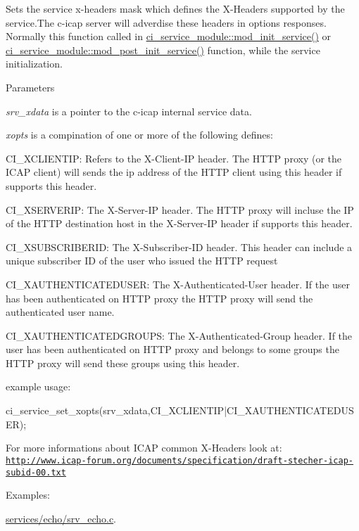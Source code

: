 Sets the service x-\/headers mask which defines the X-\/Headers supported by the service.The c-\/icap server will adverdise these headers in options responses. Normally this function called in \hyperlink{structci__service__module_acf9f56283f9418715be2f87967928876}{ci\_\-service\_\-module::mod\_\-init\_\-service()} or \hyperlink{structci__service__module_a3975fa968c80e30d77f3f1bac100e9e1}{ci\_\-service\_\-module::mod\_\-post\_\-init\_\-service()} function, while the service initialization. 
\begin{DoxyParams}{Parameters}
\item[{\em srv\_\-xdata}]is a pointer to the c-\/icap internal service data. \item[{\em xopts}]is a compination of one or more of the following defines:
\begin{DoxyItemize}
\item CI\_\-XCLIENTIP: Refers to the X-\/Client-\/IP header. The HTTP proxy (or the ICAP client) will sends the ip address of the HTTP client using this header if supports this header.
\item CI\_\-XSERVERIP: The X-\/Server-\/IP header. The HTTP proxy will incluse the IP of the HTTP destination host in the X-\/Server-\/IP header if supports this header.
\item CI\_\-XSUBSCRIBERID: The X-\/Subscriber-\/ID header. This header can include a unique subscriber ID of the user who issued the HTTP request
\item CI\_\-XAUTHENTICATEDUSER: The X-\/Authenticated-\/User header. If the user has been authenticated on HTTP proxy the HTTP proxy will send the authenticated user name.
\item CI\_\-XAUTHENTICATEDGROUPS: The X-\/Authenticated-\/Group header. If the user has been authenticated on HTTP proxy and belongs to some groups the HTTP proxy will send these groups using this header.
\end{DoxyItemize}\end{DoxyParams}
example usage: 
\begin{DoxyCode}
 ci_service_set_xopts(srv_xdata,CI_XCLIENTIP|CI_XAUTHENTICATEDUSER);
\end{DoxyCode}


For more informations about ICAP common X-\/Headers look at: \href{http://www.icap-forum.org/documents/specification/draft-stecher-icap-subid-00.txt}{\tt http://www.icap-\/forum.org/documents/specification/draft-\/stecher-\/icap-\/subid-\/00.txt} \begin{Desc}
\item[Examples: ]\par
\hyperlink{services_2echo_2srv__echo_8c-example}{services/echo/srv\_\-echo.c}.\end{Desc}
